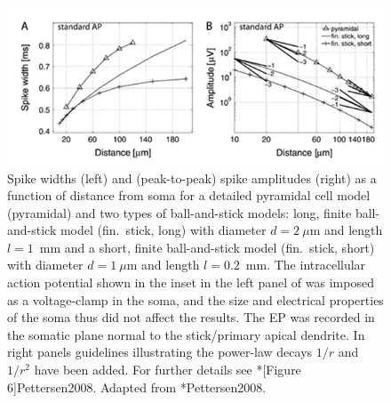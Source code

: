 \begin{figure}[!ht]
\begin{center}
\includegraphics{Figures/Spikes/Spikes-ball-and-stick-results-w100-r150}
\end{center}
\caption[]{
Spike widths (left) and (peak-to-peak) spike amplitudes (right) as a function of distance from soma for a detailed pyramidal cell model (pyramidal) and two types of ball-and-stick models: long, finite ball-and-stick model (fin.~stick, long) with diameter $d=2~\mu$m and length $l=1$~mm and a short, finite ball-and-stick model (fin.~stick, short) with diameter $d=1~\mu$m and length $l=0.2$~mm. The intracellular action potential shown in the inset in the left panel of  was imposed as a voltage-clamp in the soma, and the size and electrical properties of the soma thus did not affect the results. The EP was recorded in the somatic plane normal to the stick/primary apical dendrite. In right panels guidelines illustrating the power-law decays $1/r$ and $1/r^{2}$ have been added. For further details see \citeasnoun**[Figure 6]{Pettersen2008}.   Adapted from \citeasnoun**{Pettersen2008}.  
}
\label{fig:Spikes:ball-and-stick-results}
\end{figure}


%

